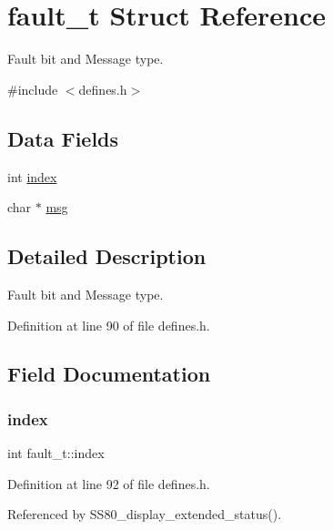 \hypertarget{structfault__t}{}\section{fault\+\_\+t Struct Reference}
\label{structfault__t}


Fault bit and Message type.  




{\ttfamily \#include $<$defines.\+h$>$}

\subsection*{Data Fields}
\begin{DoxyCompactItemize}
\item 
int \hyperlink{structfault__t_a540c9496df912b65e22c50b6a40535ef}{index}
\item 
char $\ast$ \hyperlink{structfault__t_a9037306efc26edf60b59bc1ee6843c69}{msg}
\end{DoxyCompactItemize}


\subsection{Detailed Description}
Fault bit and Message type. 

Definition at line 90 of file defines.\+h.



\subsection{Field Documentation}
\mbox{\label{structfault__t_a540c9496df912b65e22c50b6a40535ef}} 
\subsubsection{\texorpdfstring{index}{index}}
{\footnotesize\ttfamily int fault\+\_\+t\+::index}



Definition at line 92 of file defines.\+h.



Referenced by S\+S80\+\_\+display\+\_\+extended\+\_\+status().

\mbox{\label{structfault__t_a9037306efc26edf60b59bc1ee6843c69}} 
